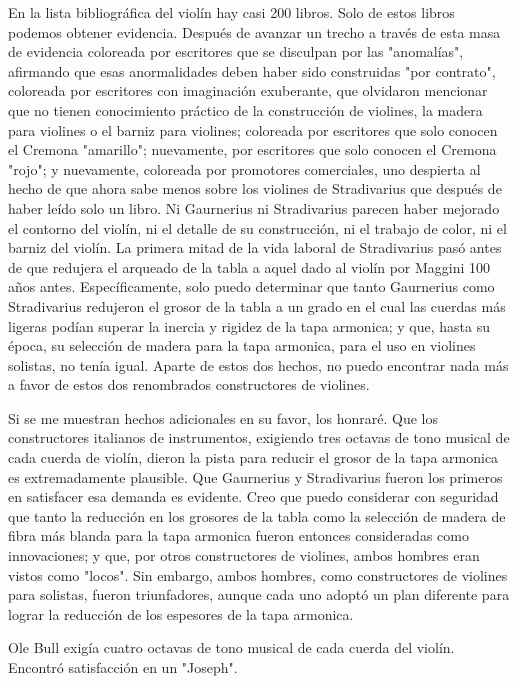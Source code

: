 \documentclass[12pt]{book}
\begin{document}
En la lista bibliográfica del violín hay casi 200 libros. Solo de estos libros podemos obtener evidencia. Después de avanzar un trecho a través de esta masa de evidencia coloreada por escritores que se disculpan por las "anomalías", afirmando que esas anormalidades deben haber sido construidas "por contrato", coloreada por escritores con imaginación exuberante, que olvidaron mencionar que no tienen conocimiento práctico de la construcción de violines, la madera para violines o el barniz para violines; coloreada por escritores que solo conocen el Cremona "amarillo"; nuevamente, por escritores que solo conocen el Cremona "rojo"; y nuevamente, coloreada por promotores comerciales, uno despierta al hecho de que ahora sabe menos sobre los violines de Stradivarius que después de haber leído solo un libro.
Ni Gaurnerius ni Stradivarius parecen haber mejorado el contorno del violín, ni el detalle de su construcción, ni el trabajo de color, ni el barniz del violín. La primera mitad de la vida laboral de Stradivarius pasó antes de que redujera el arqueado de la tabla a aquel dado al violín por Maggini 100 años antes. Específicamente, solo puedo determinar que tanto Gaurnerius como Stradivarius redujeron el grosor de la tabla a un grado en el cual las cuerdas más ligeras podían superar la inercia y rigidez de la tapa armonica; y que, hasta su época, su selección de madera para la tapa armonica, para el uso en violines solistas, no tenía igual. Aparte de estos dos hechos, no puedo encontrar nada más a favor de estos dos renombrados constructores de violines.

Si se me muestran hechos adicionales en su favor, los honraré. Que los constructores italianos de instrumentos, exigiendo tres octavas de tono musical de cada cuerda de violín, dieron la pista para reducir el grosor de la tapa armonica es extremadamente plausible. Que Gaurnerius y Stradivarius fueron los primeros en satisfacer esa demanda es evidente.
Creo que puedo considerar con seguridad que tanto la reducción en los grosores de la tabla como la selección de madera de fibra más blanda para la tapa armonica fueron entonces consideradas como innovaciones; y que, por otros constructores de violines, ambos hombres eran vistos como "locos". Sin embargo, ambos hombres, como constructores de violines para solistas, fueron triunfadores, aunque cada uno adoptó un plan diferente para lograr la reducción de los espesores de la tapa armonica.

Ole Bull exigía cuatro octavas de tono musical de cada cuerda del violín. Encontró satisfacción en un "Joseph".
\end{document}
